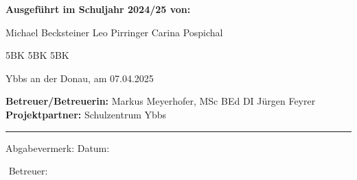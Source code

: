 \begin{titlepage}
\begin{center}
		
		\begin{minipage}[t]{0.92\textwidth}
			\begingroup
			\parfillskip=0pt
			\begin{minipage}[t]{0.46\textwidth}
				\textbf{Ausgeführt im Schuljahr 2024/25 von:} 
				\begin{minipage}[t]{0.50\textwidth}
					Michael Becksteiner \newline
					Leo Pirringer \newline
					Carina Pospichal \newline
				\end{minipage}
				\begin{minipage}[t]{0.11\textwidth}
					5BK \newline
					5BK \newline
					5BK \newline
				\end{minipage}
				\newline \newline
				Ybbs an der Donau, am 07.04.2025
			\end{minipage}
			\hfill\vline\hfill
			\begin{minipage}[t]{0.46\textwidth}
				\textbf{Betreuer/Betreuerin:} 
				\newline
				Markus Meyerhofer, MSc BEd \newline
				DI Jürgen Feyrer \newline
				\newline
				\textbf{Projektpartner:} Schulzentrum Ybbs
			\end{minipage}
			\par\endgroup
			\vspace{1cm}
		\end{minipage}
		
		\hrule
		\vspace{7mm}
		
		\begin{minipage}[t]{0.92\textwidth}
			\begingroup
			\parfillskip=0pt
			\begin{minipage}[t]{0.46\textwidth}
				Abgabevermerk:
				\newline
				\newline
				Datum:
			\end{minipage}%
			\hfill
			\begin{minipage}[t]{0.46\textwidth}
				$ $
				\newline
				\newline
				Betreuer:
			\end{minipage}%
			\par\endgroup
		\end{minipage}
		
	\end{center}
\end{titlepage}